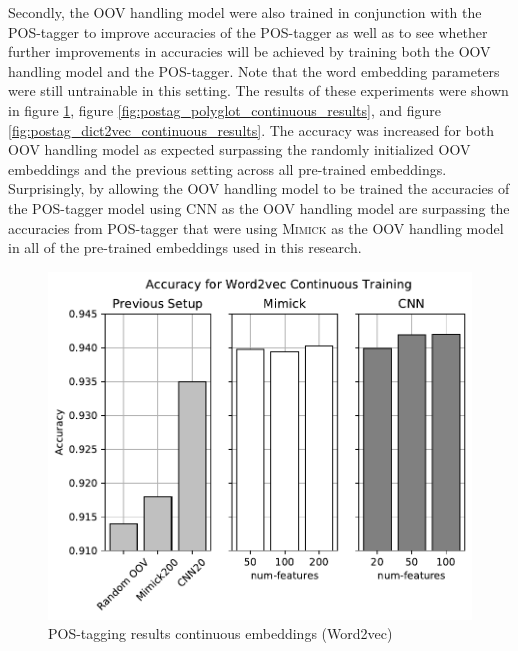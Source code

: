       Secondly, the OOV handling model were also trained in
      conjunction with the POS-tagger to improve accuracies of the
      POS-tagger as well as to see whether further improvements in
      accuracies will be achieved by training both the OOV handling
      model and the POS-tagger. Note that the word embedding
      parameters were still untrainable in this setting. The results
      of these experiments were shown in figure
      \ref{fig:postag_word2vec_continuous_results}, figure
      \ref{fig:postag_polyglot_continuous_results}, and figure
      \ref{fig:postag_dict2vec_continuous_results}. The accuracy was
      increased for both OOV handling model as expected surpassing the
      randomly initialized OOV embeddings and the previous setting
      across all pre-trained embeddings. Surprisingly, by allowing the
      OOV handling model to be trained the accuracies of the
      POS-tagger model using CNN as the OOV handling model are
      surpassing the accuracies from POS-tagger that were using
      \textsc{Mimick} as the OOV handling model in all of the
      pre-trained embeddings used in this research.
      \begin{figure}[H]
        \centering
        \includegraphics[width=0.8\linewidth]{images/continuous_word2vec.pdf}
        \caption{POS-tagging results continuous embeddings (Word2vec)}
        \label{fig:postag_word2vec_continuous_results}
      \end{figure}
